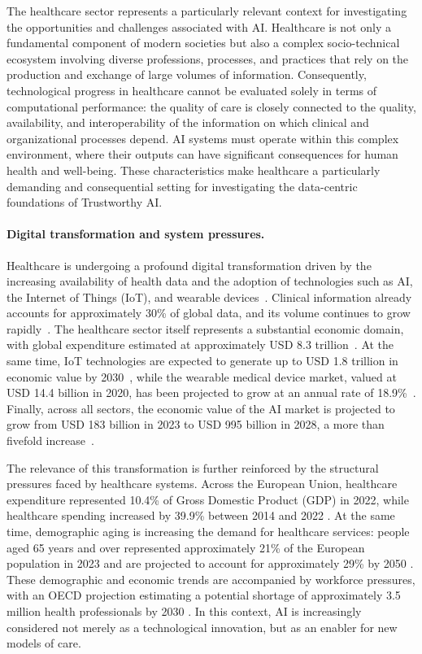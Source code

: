 The healthcare sector represents a particularly relevant context for investigating the opportunities and challenges associated with AI. Healthcare is not only a fundamental component of modern societies but also a complex socio-technical ecosystem involving diverse professions, processes, and practices that rely on the production and exchange of large volumes of information. Consequently, technological progress in healthcare cannot be evaluated solely in terms of computational performance: the quality of care is closely connected to the quality, availability, and interoperability of the information on which clinical and organizational processes depend. AI systems must operate within this complex environment, where their outputs can have significant consequences for human health and well-being. These characteristics make healthcare a particularly demanding and consequential setting for investigating the data-centric foundations of Trustworthy AI.

\paragraph{Digital transformation and system pressures.}
Healthcare is undergoing a profound digital transformation driven by the increasing availability of health data and the adoption of technologies such as AI, the Internet of Things (IoT), and wearable devices~\cite{oecd_progress_2026}. Clinical information already accounts for approximately 30\% of global data, and its volume continues to grow rapidly~\cite{thomason_data_2024}. The healthcare sector itself represents a substantial economic domain, with global expenditure estimated at approximately USD 8.3 trillion~\cite{thomason_data_2024}. At the same time, IoT technologies are expected to generate up to USD 1.8 trillion in economic value by 2030~\cite{seixas-lopes_musculoskeletal_2024}, while the wearable medical device market, valued at USD 14.4 billion in 2020, has been projected to grow at an annual rate of 18.9\%~\cite{thomason_data_2024}. Finally, across all sectors, the economic value of the AI market is projected to grow from USD 183 billion in 2023 to USD 995 billion in 2028, a more than fivefold increase~\cite{oecd_collective_2024}.

The relevance of this transformation is further reinforced by the structural pressures faced by healthcare systems. Across the European Union, healthcare expenditure represented 10.4\% of Gross Domestic Product (GDP) in 2022, while healthcare spending increased by 39.9\% between 2014 and 2022 \cite{oecd_progress_2026}. At the same time, demographic aging is increasing the demand for healthcare services: people aged 65 years and over represented approximately 21\% of the European population in 2023 and are projected to account for approximately 29\% by 2050 \cite{oecd_progress_2026}. These demographic and economic trends are accompanied by workforce pressures, with an OECD projection estimating a potential shortage of approximately 3.5 million health professionals by 2030 \cite{oecd_progress_2026}. In this context, AI is increasingly considered not merely as a technological innovation, but as an enabler for new models of care.

